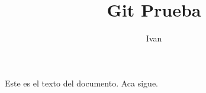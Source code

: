 \documentclass[10pt]{article}
\author{Ivan}
\title{Git Prueba}
\begin{document}
	\maketitle
	
	Este es el texto del documento.
	Aca sigue.
\end{document}
